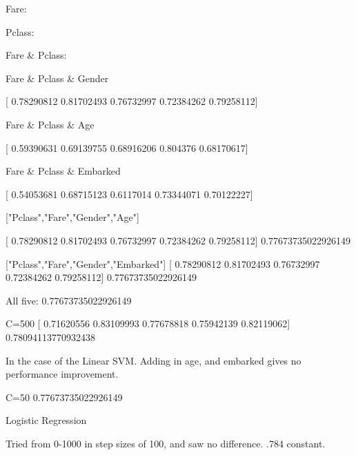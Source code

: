 \documentclass{article}
\begin{document}
Fare:

Pclass:

Fare & Pclass:

Fare & Pclass & Gender


[ 0.78290812  0.81702493  0.76732997  0.72384262  0.79258112]

Fare & Pclass & Age


[ 0.59390631  0.69139755  0.68916206  0.804376    0.68170617]

Fare & Pclass & Embarked


[ 0.54053681  0.68715123  0.6117014   0.73344071  0.70122227]


["Pclass","Fare","Gender","Age"]


[ 0.78290812  0.81702493  0.76732997  0.72384262  0.79258112]
0.77673735022926149

["Pclass","Fare","Gender","Embarked"]
[ 0.78290812  0.81702493  0.76732997  0.72384262  0.79258112]
0.77673735022926149

All five: 0.77673735022926149


C=500
[ 0.71620556  0.83109993  0.77678818  0.75942139  0.82119062]
0.78094113770932438

In the case of the Linear SVM. Adding in age, and embarked gives no performance improvement. 

C=50
0.77673735022926149

Logistic Regression

Tried from 0-1000 in step sizes of 100, and saw no difference. .784 constant. 



\end{document}
